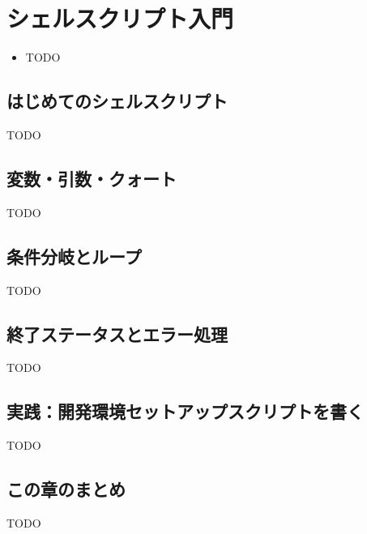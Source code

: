 \chapter{シェルスクリプト入門}
\label{chap:shellscript}

\begin{goalbox}
  \begin{itemize}
    \item TODO
  \end{itemize}
\end{goalbox}

\section{はじめてのシェルスクリプト}

TODO

\section{変数・引数・クォート}

TODO

\section{条件分岐とループ}

TODO

\section{終了ステータスとエラー処理}

TODO

\section{実践：開発環境セットアップスクリプトを書く}

TODO

\section*{この章のまとめ}

TODO
